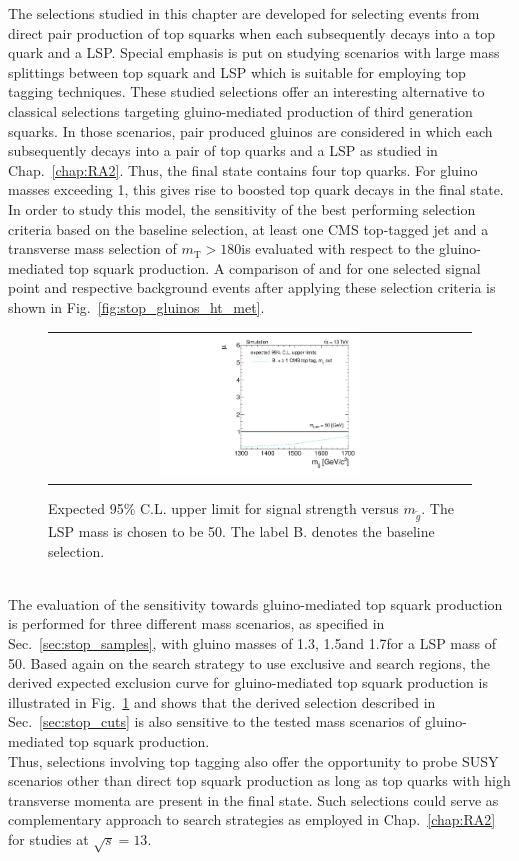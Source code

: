 The selections studied in this chapter are developed for selecting events from direct pair production of top squarks when each subsequently decays into a top quark and a LSP. Special emphasis is put on studying scenarios with large mass splittings between top squark and LSP which is suitable for employing top tagging techniques. These studied selections offer an interesting alternative to classical selections targeting gluino-mediated production of third generation squarks. In those scenarios, pair produced gluinos are considered in which each subsequently decays into a pair of top quarks and a LSP as studied in Chap.~\ref{chap:RA2}. Thus, the final state contains four top quarks. For gluino masses exceeding 1\tev, this gives rise to boosted top quark decays in the final state. In order to study this model, the sensitivity of the best performing selection criteria based on the baseline selection, at least one CMS top-tagged jet and a transverse mass selection of $m_\mathrm{T} > 180$\gev is evaluated with respect to the gluino-mediated top squark production. A comparison of \HT and \met for one selected signal point and respective background events after applying these selection criteria is shown in Fig.~\ref{fig:stop_gluinos_ht_met}. 
\begin{figure}[!b]
  \centering
  \begin{tabular}{c}
                \includegraphics[width=0.49\textwidth]{figures/limitplot4BinSel_T1tttt.pdf} 
  \end{tabular}
  \caption{Expected 95\% C.L. upper limit for signal strength versus $m_{\tilde{g}}$. The LSP mass is chosen to be 50\gev. The label B. denotes the baseline selection.}
  \label{fig:stop_gluino_mediated_limit}
\end{figure}
\\
The evaluation of the sensitivity towards gluino-mediated top squark production is performed for three different mass scenarios, as specified in Sec.~\ref{sec:stop_samples}, with gluino masses of 1.3\tev, 1.5\tev and 1.7\tev for a LSP mass of 50\gev. Based again on the search strategy to use exclusive \HT and \met search regions, the derived expected exclusion curve for gluino-mediated top squark production is illustrated in Fig.~\ref{fig:stop_gluino_mediated_limit} and shows that the derived selection described in Sec.~\ref{sec:stop_cuts} is also sensitive to the tested mass scenarios of gluino-mediated top squark production. \\
Thus, selections involving top tagging also offer the opportunity to probe SUSY scenarios other than direct top squark production as long as top quarks with high transverse momenta are present in the final state. Such selections could serve as complementary approach to search strategies as employed in Chap.~\ref{chap:RA2} for studies at $\sqrt{s} = 13$\tev. 

